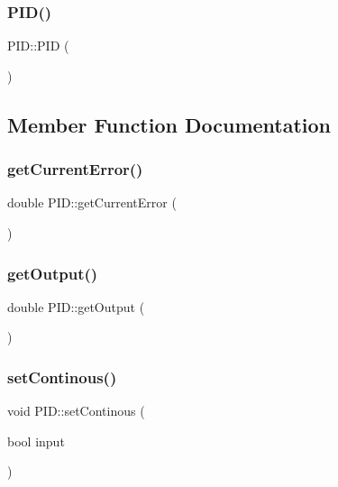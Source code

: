 \subsubsection{\texorpdfstring{P\+I\+D()}{PID()}}
{\footnotesize\ttfamily P\+I\+D\+::\+P\+ID (\begin{DoxyParamCaption}{ }\end{DoxyParamCaption})}



\subsection{Member Function Documentation}
\mbox{\label{classPID_a9ba7082205aa282a8fb42067f1432201}} 
\subsubsection{\texorpdfstring{get\+Current\+Error()}{getCurrentError()}}
{\footnotesize\ttfamily double P\+I\+D\+::get\+Current\+Error (\begin{DoxyParamCaption}{ }\end{DoxyParamCaption})}

\mbox{\label{classPID_ae0f84ab82896e8a66839454d6ed53a99}} 
\subsubsection{\texorpdfstring{get\+Output()}{getOutput()}}
{\footnotesize\ttfamily double P\+I\+D\+::get\+Output (\begin{DoxyParamCaption}{ }\end{DoxyParamCaption})}

\mbox{\label{classPID_a640deac7e631eb4858cc0a52cc71c18f}} 
\subsubsection{\texorpdfstring{set\+Continous()}{setContinous()}}
{\footnotesize\ttfamily void P\+I\+D\+::set\+Continous (\begin{DoxyParamCaption}\item[{bool}]{input }\end{DoxyParamCaption})}

